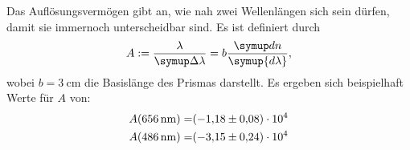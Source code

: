 Das Auflösungsvermögen gibt an, wie nah zwei Wellenlängen sich sein dürfen, damit sie immernoch unterscheidbar sind.
Es ist definiert durch
\begin{equation}
	A := \frac{\lambda}{\symup\Delta\lambda} = b\frac{\symup dn}{\symup{d\lambda}},
\end{equation}
wobei $b=\SI{3}{\centi\meter}$\cite{v402} die Basislänge des Prismas darstellt.
Es ergeben sich beispielhaft Werte für $A$ von:
\begin{align}
	A(\SI{656}{\nano\meter}) =& \num{-1.18\pm0.08e4} \\ 
	A(\SI{486}{\nano\meter}) =& \num{-3.15\pm0.24e4} 
\end{align}
